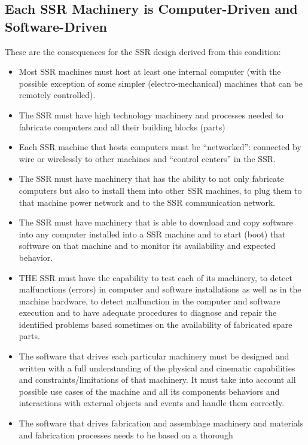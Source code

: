 \subsection[Each SSR Machinery is Computer{}-Driven and
Software{}-Driven]{Each SSR Machinery is Computer-Driven and
Software-Driven}

\hypertarget{RefHeading3132306210128}{}These are the consequences for
the SSR design derived from this condition:

\begin{itemize}
\item Most SSR machines must host at least one internal computer (with
the possible exception of some simpler (electro-mechanical) machines
that can be remotely controlled).
\item The SSR must have high technology machinery and processes needed
to fabricate computers and all their building blocks (parts)
\item Each SSR machine that hosts computers must be “networked”:
connected by wire or wirelessly to other machines and “control centers”
in the SSR.
\item The SSR must have machinery that has the ability to not only
fabricate computers but also to install them into other SSR machines,
to plug them to that machine power network and to the SSR communication
network.
\item The SSR must have machinery that is able to download and copy
software into any computer installed into a SSR machine and to start
(boot) that software on that machine and to monitor its availability
and expected behavior.
\item THE SSR must have the capability to test each of its machinery, to
detect malfunctions (errors) in computer and software installations as
well as in the machine hardware, to detect malfunction in the computer
and software execution and to have adequate procedures to diagnose and
repair the identified problems based sometimes on the availability of
fabricated spare parts.
\item The software that drives each particular machinery must be
designed and written with a full understanding of the physical and
cinematic capabilities and constraints/limitations of that machinery.
It must take into account all possible use cases of the machine and all
its components behaviors and interactions with external objects and
events and handle them correctly.
\item The software that drives fabrication and assemblage machinery and
materials and fabrication processes needs to be based on a thorough

\end{itemize}
